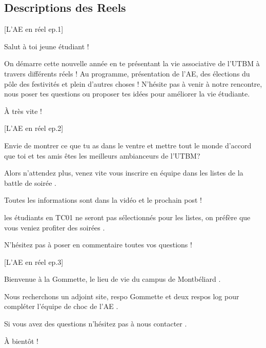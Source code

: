 


\subsection*{Descriptions des Reels}\label{subsec:descriptions-reels}



[L'\gls{AE} en réel ep.1]

\noindent Salut à toi jeune étudiant !

\noindent On démarre cette nouvelle année en te présentant la vie associative de l'\gls{UTBM} à travers différents réels !
\noindent Au programme, présentation de l'\gls{AE}, des élections du pôle des festivités et plein d'autres choses !
\noindent N'hésite pas à venir à notre rencontre, nous poser tes questions ou proposer tes idées pour améliorer la vie étudiante.

\noindent À très vite !


[L'\gls{AE} en réel ep.2]

\noindent Envie de montrer ce que tu as dans le ventre et mettre tout le monde d'accord que toi et tes amis êtes les meilleurs ambianceurs de l'\gls{UTBM}? 

\noindent Alors n'attendez plus, venez vite vous inscrire en équipe dans les listes de la battle de soirée .

\noindent Toutes les informations sont dans la vidéo et le prochain post  !

\noindent {} les étudiants en TC01 ne seront pas sélectionnés pour les listes, on préfère que vous veniez profiter des soirées .

\noindent N'hésitez pas à poser en commentaire toutes vos questions !


[L'\gls{AE} en réel ep.3]

\noindent Bienvenue à la Gommette, le lieu de vie du campus de Montbéliard .

\noindent Nous recherchons un adjoint site, respo Gommette et deux respos log pour compléter l'équipe de choc de l'\gls{AE} .

\noindent Si vous avez des questions n'hésitez pas à nous contacter .

\noindent À bientôt  !




